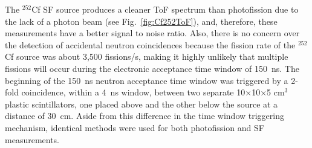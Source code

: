 The $^{252}$Cf SF source produces a cleaner ToF spectrum than photofission due to the lack of a photon beam (see Fig.~\ref{fig:Cf252ToF}), and, therefore, these measurements have a better signal to noise ratio.
Also, there is no concern over the detection of accidental neutron coincidences because the fission rate of the $^{252}$Cf source was about 3,500 fissions/s, making it highly unlikely that multiple fissions will occur during the electronic acceptance time window of 150~ns.
The beginning of the 150~ns neutron acceptance time window was triggered by a 2-fold coincidence, within a 4~ns window, between two separate 10$\times$10$\times$5 cm$^3$ plastic scintillators, one placed above and the other below the source at a distance of 30~cm.
Aside from this difference in the time window triggering mechanism, identical methods were used for both photofission and SF measurements.
\FloatBarrier